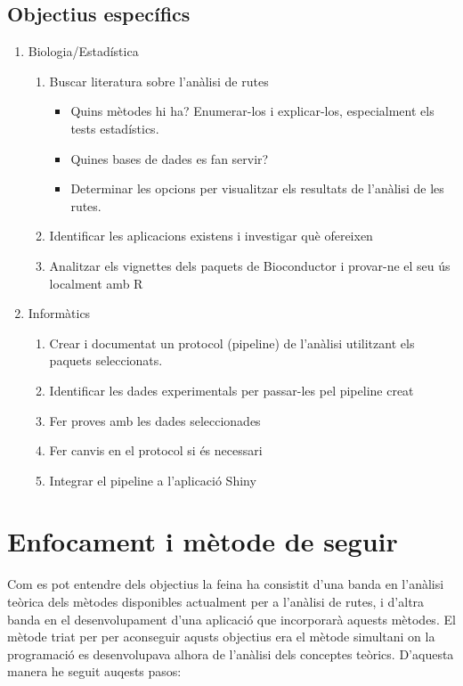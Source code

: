 \subsection{Objectius específics}
\begin{enumerate}
\item Biologia/Estadística
\begin{enumerate}
\item Buscar literatura sobre l'anàlisi de rutes
\begin{itemize}
\item Quins mètodes hi ha? Enumerar-los i explicar-los, especialment els tests estadístics.
\item Quines bases de dades es fan servir?
\item Determinar les opcions per visualitzar els resultats de l'anàlisi de les rutes.
\end{itemize}
\item Identificar les aplicacions existens i investigar què ofereixen
\item Analitzar els vignettes dels paquets de Bioconductor i provar-ne el seu ús localment amb R
\end{enumerate}
\item Informàtics
\begin{enumerate}
\item Crear i documentat un protocol (pipeline) de l'anàlisi utilitzant els paquets seleccionats. 
\item Identificar les dades experimentals per passar-les pel pipeline creat
\item Fer proves amb les dades seleccionades
\item Fer canvis en el protocol si és necessari
\item Integrar el pipeline a l'aplicació Shiny
\end{enumerate}
\end{enumerate}

\section{Enfocament i mètode de seguir}

Com es pot entendre dels objectius la feina ha consistit d'una banda en l'anàlisi teòrica dels mètodes disponibles actualment per a l'anàlisi de rutes, i d'altra banda en el desenvolupament d'una aplicació que incorporarà aquests mètodes. El mètode triat per per aconseguir aqusts objectius era el mètode simultani on la programació es desenvolupava alhora de l'anàlisi dels conceptes teòrics. D'aquesta manera he seguit auqests pasos:

